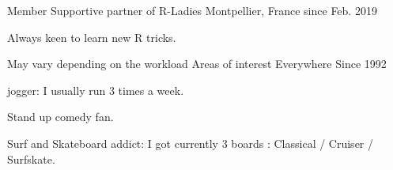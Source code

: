 

\begin{cventries}

%
  \cventry
    {Member} %
    {Supportive partner of R-Ladies} %
    {Montpellier, France} %
    {since Feb. 2019} %
    {
      \begin{cvitems} %
        \item {Always keen to learn new R tricks.}
      \end{cvitems}
    }
    
  \cventry
    {May vary depending on the workload} %
    {Areas of interest} %
    {Everywhere} %
    {Since 1992} %
    {
      \begin{cvitems} %
        \item {jogger: I usually run 3 times a week.}
        \item {Stand up comedy fan.}
        \item {Surf and Skateboard addict: I got currently 3 boards : Classical / Cruiser / Surfskate.}
      \end{cvitems}
    }

\end{cventries}
